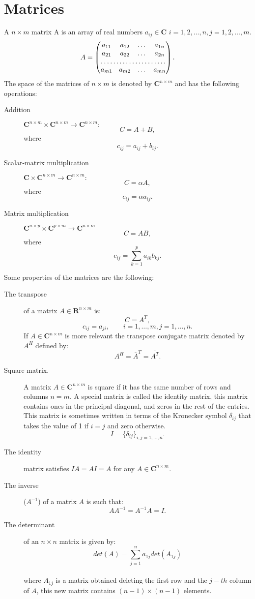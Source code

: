 \documentclass[a4paper,10pt]{report}
\begin{document}
\section{Matrices}
A $n\times m$ matrix A is an array of real numbers $a_{ij} \in \mathbf{C}$  $i=1,2,\dots,n, j=1,2,\dots,m$.
\begin{equation*}
A
=
\begin{pmatrix}
a_{11} & a_{12} & \dots & a_{1n}\\
a_{21} & a_{22} & \dots & a_{2n}\\
\hdotsfor{4}\\
a_{m1} & a_{m2} & \dots &a_{mn}
\end{pmatrix}
.
\end{equation*}
The space of the matrices of $n\times m$ is denoted by $\mathbf{C}^{n\times m}$ and has the following operations:
\begin{description}
 \item[Addition] $\mathbf{C}^{n\times m} \times \mathbf{C}^{n\times m} \xrightarrow{} \mathbf{C}^{n\times m}:$
$$C=A+B,$$ where $$c_{ij}=a_{ij}+b_{ij}.$$
\item [Scalar-matrix multiplication] $\mathbf{C} \times \mathbf{C}^{n\times m} \xrightarrow{} \mathbf{C}^{n\times m}:$
$$C=\alpha A,$$ where $$c_{ij}=\alpha a_{ij}.$$
\item [Matrix multiplication] $\mathbf{C}^{n\times p} \times \mathbf{C}^{p\times m} \xrightarrow{} \mathbf{C}^{n\times m}$
$$C=AB,$$ where $$c_{ij}=\sum_{k=1}^p a_{ik}b_{kj}.$$
\end{description}
Some properties of the matrices are the following:
\begin{description}
 \item [The transpose] of a matrix $A \in \mathbf{R}^{n\times m}$ is:
$$C=A^T,$$
$$c_{ij}=a_{ji}, \qquad i=1,\dots,m, j=1,\dots,n.$$
If $A \in \mathbf{C}^{n\times m}$ is more relevant the transpose conjugate matrix denoted by $A^H$ defined by:
$$A^H=\overline{A}^T=\overline{A^T}.$$
\item[Square matrix.] A matrix $A\in \mathbf{C}^{n\times m}$ is square if it has the same number of rows and columns $n=m.$
A special matrix is called the identity matrix, this matrix contains ones in the principal diagonal, and zeros in the rest of the entries.
This matrix is sometimes written in terms of the Kronecker symbol $\delta_{ij}$ that takes the value of 1 if $i=j$ and zero otherwise.
$$I=\{\delta_{ij}\}_{i,j=1,\dots ,n}.$$
\item[The identity] matrix satisfies $IA=AI=A$ for any $A\in \mathbf{C}^{n\times m}$.
\item[The inverse] ($A^{-1}$) of a matrix $A$ is such that: $$AA^{-1}=A^{-1}A=I.$$
\item[The determinant] of an $n\times n$ matrix is given by:
$$det(A)=\sum_{j=1}^n a_{1j}det(A_{1j})$$\\
where $A_{1j}$ is a matrix obtained deleting the first row and the $j-th$ column of $A$, this new matrix
contains $(n-1)\times (n-1)$ elements.
\end{description}
\end{document}
